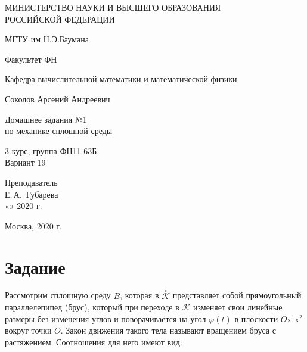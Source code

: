 \documentclass[14pt,a4paper]{scrartcl}
\begin{document}
	\begin{titlepage}
	\begin{center}
		\large
		МИНИСТЕРСТВО НАУКИ И ВЫСШЕГО ОБРАЗОВАНИЯ\\ РОССИЙСКОЙ ФЕДЕРАЦИИ
		
		\vspace{0.5cm}
		
		МГТУ им Н.Э.Баумана
		\vspace{0.25cm}
		
		Факультет ФН
		
		Кафедра вычислительной математики и математической физики
		\vfill
		
		
		Соколов Арсений Андреевич\\
		\vfill
		
		
		{\LARGE Домашнее задания №1 \\ по механике сплошной среды\\[2mm]
		}
		\bigskip
		
		3 курс, группа ФН11-63Б\\
		Вариант 19
	\end{center}
	\vfill
	
	\newlength{\ML}
	\hfill\begin{minipage}{0.4\textwidth}
		Преподаватель\\
		\underline{\hspace{3cm}} Е.\,А.~Губарева\\
		«\underline{\hspace{0.7cm}}» \underline{\hspace{1.71cm}} 2020 г.
	\end{minipage}%
	\bigskip
	
	
	\vfill
	
	\begin{center}
		Москва, 2020 г.
	\end{center}
\end{titlepage}

\section*{Задание}
Рассмотрим сплошную среду $B$, которая в $\mathcal{\overset{\circ}{K}}$ представляет собой прямоугольный параллелепипед (брус), который при переходе в $\mathcal{K}$ изменяет свои линейные размеры без изменения углов и поворачивается на угол $\varphi(t)$ в плоскости $O\mathrm{x}^1\mathrm{x}^2$ вокруг точки $O$. Закон движения такого тела называют вращением бруса с растяжением. Соотношения для него имеют вид:
\end{document}

